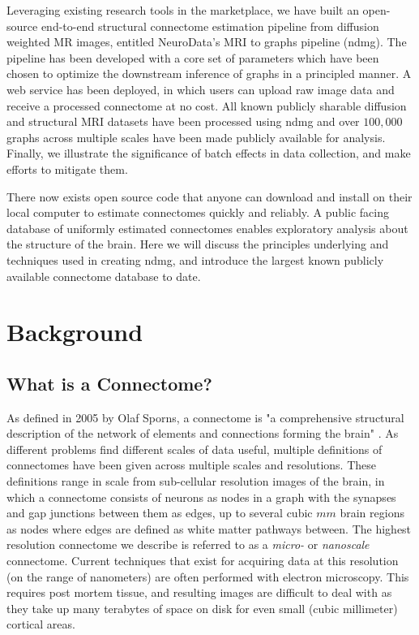 Leveraging existing research tools in the marketplace, we have built an open-source end-to-end structural connectome estimation pipeline from diffusion weighted MR images, entitled NeuroData's MRI to graphs pipeline (ndmg). The pipeline has been developed with a core set of parameters which have been chosen to optimize the downstream inference of graphs in a principled manner. A web service has been deployed, in which users can upload raw image data and receive a processed connectome at no cost. All known publicly sharable diffusion and structural MRI datasets have been processed using ndmg and over $100,000$ graphs across multiple scales have been made publicly available for analysis. Finally, we illustrate the significance of batch effects in data collection, and make efforts to mitigate them.

There now exists open source code that anyone can download and install on their local computer to estimate connectomes quickly and reliably. A public facing database of uniformly estimated connectomes enables exploratory analysis about the structure of the brain. Here we will discuss the principles underlying and techniques used in creating ndmg, and introduce the largest known publicly available connectome database to date.

\chapter{Background}
\label{sec:bg}
\section{What is a Connectome?}
\label{sec:define}
As defined in 2005 by Olaf Sporns, a connectome is "a comprehensive structural description of the network of elements and connections forming the brain" \cite{Sporns2005}. As different problems find different scales of data useful, multiple definitions of connectomes have been given across multiple scales and resolutions. These definitions range in scale from sub-cellular resolution images of the brain, in which a connectome consists of neurons as nodes in a graph with the synapses and gap junctions between them as edges, up to several cubic $mm$ brain regions as nodes where edges are defined as white matter pathways between. The highest resolution connectome we describe is referred to as a \textit{micro-} or \textit{nanoscale} connectome. Current techniques that exist for acquiring data at this resolution (on the range of nanometers) are often performed with electron microscopy. This requires post mortem tissue, and resulting images are difficult to deal with as they take up many terabytes of space on disk for even small (cubic millimeter) cortical areas.

